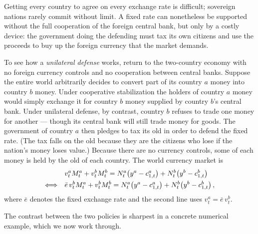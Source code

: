 Getting every country to agree on every exchange rate is difficult; sovereign nations rarely commit without limit. A fixed rate can nonetheless be supported without the full cooperation of the foreign central bank, but only by a costly device: the government doing the defending must tax its own citizens and use the proceeds to buy up the foreign currency that the market demands.

To see how a \emph{unilateral defense} works, return to the two-country economy with no foreign currency controls and no cooperation between central banks. Suppose the entire world arbitrarily decides to convert part of its country $a$ money into country $b$ money. Under cooperative stabilization the holders of country $a$ money would simply exchange it for country $b$ money supplied by country $b$'s central bank. Under unilateral defense, by contrast, country $b$ refuses to trade one money for another --- though its central bank will still trade money for goods. The government of country $a$ then pledges to tax its old in order to defend the fixed rate. (The tax falls on the old because they are the citizens who lose if the nation's money loses value.) Because there are no currency controls, some of each money is held by the old of each country. The world currency market is
\[
\begin{aligned}
& v_t^a M_t^a + v_t^b M_t^b = N_t^a\!\left(y^a - c_{1,t}^a\right) + N_t^b\!\left(y^b - c_{1,t}^b\right)\\
\Longleftrightarrow\quad & \bar e\, v_t^b M_t^a + v_t^b M_t^b = N_t^a\!\left(y^a - c_{1,t}^a\right) + N_t^b\!\left(y^b - c_{1,t}^b\right),
\end{aligned}
\]
where $\bar e$ denotes the fixed exchange rate and the second line uses $v_t^a = \bar e\, v_t^b$.

The contrast between the two policies is sharpest in a concrete numerical example, which we now work through.

